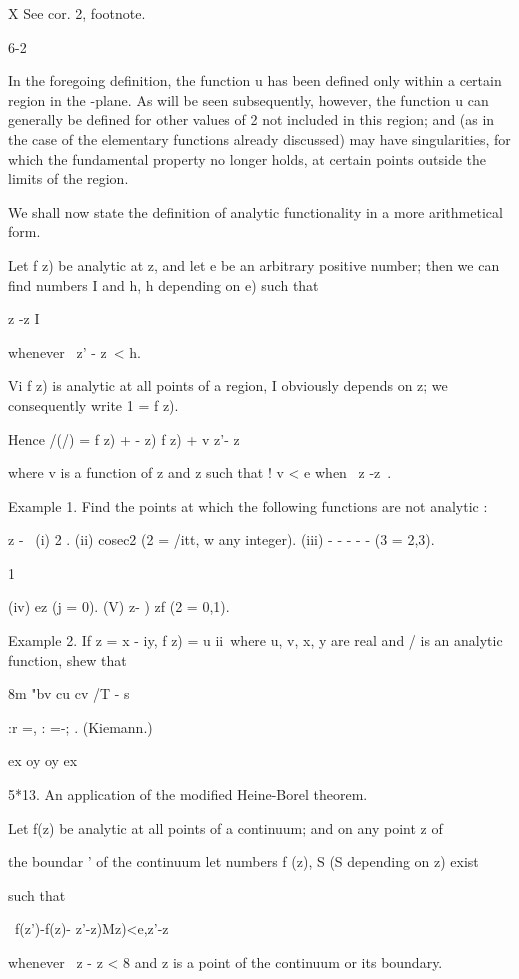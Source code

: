 X See cor. 2, footnote.

6-2

%
%

In the foregoing definition, the function u has been defined only
within a certain region in the -plane. As will be seen subsequently,
however, the function u can generally be defined for other values of 2
not included in this region; and (as in the case of the elementary
functions already discussed) may have singularities, for which the
fundamental property no longer holds, at certain points outside the
limits of the region.

We shall now state the definition of analytic functionality in a more
arithmetical form.

Let f z) be analytic at z, and let e be an arbitrary positive number;
then we can find numbers I and h, h depending on e) such that

z -z I

whenever \ z' - z\ < h.

Vi f z) is analytic at all points of a region, I obviously depends on
z; we consequently write 1 = f z).

Hence /(/) = f z) + - z) f z) + v z'- z\

where v is a function of z and z such that ! v < e when \ z -z\ < t>.

Example 1. Find the points at which the following functions are not
analytic :

z - \ (i) 2 . (ii) cosec2 (2 = /itt, w any integer). (iii) - - - - -
(3 = 2,3).

1

(iv) ez (j = 0). (V) z- ) zf (2 = 0,1).

Example 2. If z = x - iy, f z) = u ii\ where u, v, x, y are real and /
is an analytic function, shew that

8m "bv cu cv /T - s

 :r =, : =-; . (Kiemann.)

ex oy oy ex

5*13. An application of the modified Heine-Borel theorem.

Let f(z) be analytic at all points of a continuum; and on any point z
of

the boundar ' of the continuum let numbers f (z), S (S depending on z)
exist

such that

\ f(z')-f(z)- z'-z)Mz)<e,z'-z\

whenever \ z - z < 8 and z is a point of the continuum or its
boundary.

